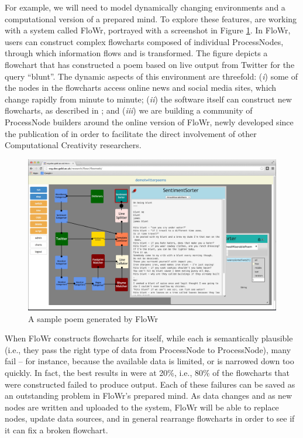 \smallskip

For example, we will need to model dynamically changing environments
and a computational version of a prepared mind.
%
To explore these features, are working with a system called {\sf
  FloWr}, portrayed with a screenshot in Figure \ref{fig:being-blunt}.
In {\sf FloWr}, users can construct complex flowcharts composed of
individual ProcessNodes, through which information flows and is
transformed.  The figure depicts a flowchart that has constructed a
poem based on live output from Twitter for the query ``blunt''.  The
dynamic aspects of this environment are threefold: (\emph{i}) some of
the nodes in the flowcharts access online news and social media sites,
which change rapidly from minute to minute; (\emph{ii}) the software
itself can construct new flowcharts, as described in
\cite{charnley2014flowr}; and (\emph{iii}) we are building a community
of ProcessNode builders around the online version of {\sf FloWr},
newly developed since the publication of \cite{charnley2014flowr} in
order to facilitate the direct involvement of other Computational
Creativity researchers.

\begin{figure}
\centering
\includegraphics[width=.95\textwidth]{being-blunt}
\caption{A sample poem generated by {\sf FloWr}\label{fig:being-blunt}}
\end{figure}


When {\sf FloWr} constructs flowcharts for itself, while each is
semantically plausible (i.e., they pass the right type of data from
ProcessNode to ProcessNode), many fail -- for instance, because the
available data is limited, or is narrowed down too quickly.  In fact,
the best results in \cite{charnley2014flowr} were at 20\%, i.e., 80\%
of the flowcharts that were constructed failed to produce output.
Each of these failures can be saved as an outstanding problem in {\sf
  FloWr}'s prepared mind.  As data changes and as new nodes are
written and uploaded to the system, {\sf FloWr} will be able to replace nodes,
update data sources, and in general rearrange flowcharts in order to
see if it can fix a broken flowchart.


